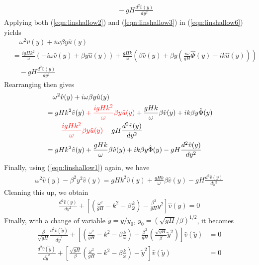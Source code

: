 \begin{solution}
\begin{align}
&\quad- gH \frac{d^2\hat{v}(y)}{dy^2}   \label{eqn:linshallow6}   
\end{align}
Applying both (\ref{eqn:linshallow2}) and (\ref{eqn:linshallow3}) in (\ref{eqn:linshallow6}) yields
\begin{align}
&\quad \omega^2 \hat{v}(y) + i \omega\beta y \hat{u}(y) \nonumber \\
&= \frac{i gHk^2}{\omega}(-i\omega \hat{v}(y) + \beta y \hat{u}(y)) + \frac{gHk}{\omega}\left(\beta\hat{v}(y) + \beta y \left(\frac{i \omega}{gH} \hat{\Phi}(y) - i k\hat{u}(y)\right)\right)  \nonumber \\
&\quad - gH \frac{d^2\hat{v}(y)}{dy^2}    
\end{align}
Rearranging then gives
\begin{align}
&\quad \omega^2 \hat{v}(y) + i \omega\beta y \hat{u}(y) \nonumber \\
&= gHk^2 \hat{v}(y) \mathcolor{red}{+ \frac{i gHk^2}{\omega} \beta y \hat{u}(y)} + \frac{gHk}{\omega}\beta\hat{v}(y) + i k \beta y \hat{\Phi}(y) \nonumber \\
&\quad \mathcolor{red}{- \frac{i gHk^2}{\omega} \beta y \hat{u}(y)} - gH \frac{d^2\hat{v}(y)}{dy^2} \nonumber \\
&= gHk^2 \hat{v}(y)  + \frac{gHk}{\omega}\beta\hat{v}(y) + i k \beta y \hat{\Phi}(y) - gH \frac{d^2\hat{v}(y)}{dy^2}
\end{align}
Finally, using (\ref{eqn:linshallow1}) again, we have
\begin{align}
\omega^2 \hat{v}(y) - \beta^2 y^2 \hat{v}(y) = gHk^2 \hat{v}(y)  + \frac{gHk}{\omega}\beta\hat{v}(y) - gH \frac{d^2\hat{v}(y)}{dy^2}    
\end{align}
Cleaning this up, we obtain
\begin{align}
\frac{d^2\hat{v}(y)}{dy^2} + \left[\left(\frac{\omega^2}{gH} - k^2 - \beta\frac{k}{\omega}\right) - \frac{\beta^2}{gH}y^2\right]\hat{v}(y) = 0
\end{align}
Finally, with a change of variable $\tilde{y} = y/y_0$, $y_0 = (\sqrt{gH}/\beta)^{1/2}$, it becomes
\begin{align}
\frac{\beta}{\sqrt{gH}} \frac{d^2\hat{v}(\tilde{y})}{d\tilde{y}^2} + \left[\left(\frac{\omega^2}{gH} - k^2 - \beta\frac{k}{\omega}\right) - \frac{\beta^2}{gH}\left(\frac{\sqrt{gH}}{\beta}\tilde{y}^2\right)\right]\hat{v}(\tilde{y}) &= 0 \nonumber \\
\frac{d^2\hat{v}(\tilde{y})}{d\tilde{y}^2} + \left[\frac{\sqrt{gH}}{\beta}\left(\frac{\omega^2}{gH} - k^2 - \beta\frac{k}{\omega}\right) - \tilde{y}^2\right]\hat{v}(\tilde{y}) &= 0   

\end{align}
\end{solution}
